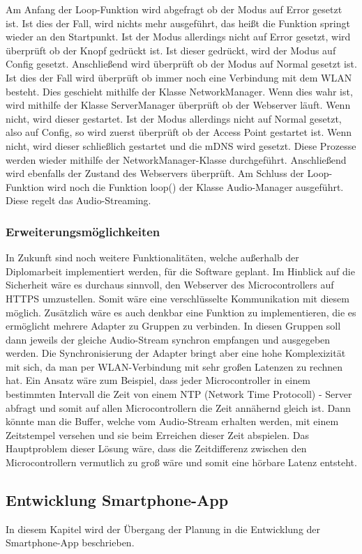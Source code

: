 \documentclass[11pt, twoside]{article}
\begin{document}
Am Anfang der Loop-Funktion wird abgefragt ob der Modus auf Error gesetzt ist. Ist dies der Fall, wird nichts mehr ausgeführt, das heißt die Funktion springt wieder an den Startpunkt. Ist der Modus allerdings nicht auf Error gesetzt, wird überprüft ob der Knopf gedrückt ist. Ist dieser gedrückt, wird der Modus auf Config gesetzt. Anschließend wird überprüft ob der Modus auf Normal gesetzt ist. Ist dies der Fall wird überprüft ob immer noch eine Verbindung mit dem WLAN besteht. Dies geschieht mithilfe der Klasse NetworkManager. Wenn dies wahr ist, wird mithilfe der Klasse ServerManager überprüft ob der Webserver läuft. Wenn nicht, wird dieser gestartet. Ist der Modus allerdings nicht auf Normal gesetzt, also auf Config, so wird zuerst überprüft ob der Access Point gestartet ist. Wenn nicht, wird dieser schließlich gestartet und die mDNS wird gesetzt. Diese Prozesse werden wieder mithilfe der NetworkManager-Klasse durchgeführt. Anschließend wird ebenfalls der Zustand des Webservers überprüft. Am Schluss der Loop-Funktion wird noch die Funktion loop() der Klasse Audio-Manager ausgeführt. Diese regelt das Audio-Streaming.
\subsubsection{Erweiterungsmöglichkeiten}
In Zukunft sind noch weitere Funktionalitäten, welche außerhalb der Diplomarbeit implementiert werden, für die Software geplant. Im Hinblick auf die Sicherheit wäre es durchaus sinnvoll, den Webserver des Microcontrollers auf HTTPS umzustellen. Somit wäre eine verschlüsselte Kommunikation mit diesem möglich. Zusätzlich wäre es auch denkbar eine Funktion zu implementieren, die es ermöglicht mehrere Adapter zu Gruppen zu verbinden. In diesen Gruppen soll dann jeweils der gleiche Audio-Stream synchron empfangen und ausgegeben werden. Die Synchronisierung der Adapter bringt aber eine hohe Komplexizität mit sich, da man per WLAN-Verbindung mit sehr großen Latenzen zu rechnen hat. Ein Ansatz wäre zum Beispiel, dass jeder Microcontroller in einem bestimmten Intervall die Zeit von einem NTP (Network Time Protocoll) - Server abfragt und somit auf allen Microcontrollern die Zeit annähernd gleich ist. Dann könnte man die Buffer, welche vom Audio-Stream erhalten werden, mit einem Zeitstempel versehen und sie beim Erreichen dieser Zeit abspielen. Das Hauptproblem dieser Lösung wäre, dass die Zeitdifferenz zwischen den Microcontrollern vermutlich zu groß wäre und somit eine hörbare Latenz entsteht.
\subsection{Entwicklung Smartphone-App}
In diesem Kapitel wird der Übergang der Planung in die Entwicklung der Smartphone-App beschrieben.
\end{document}
